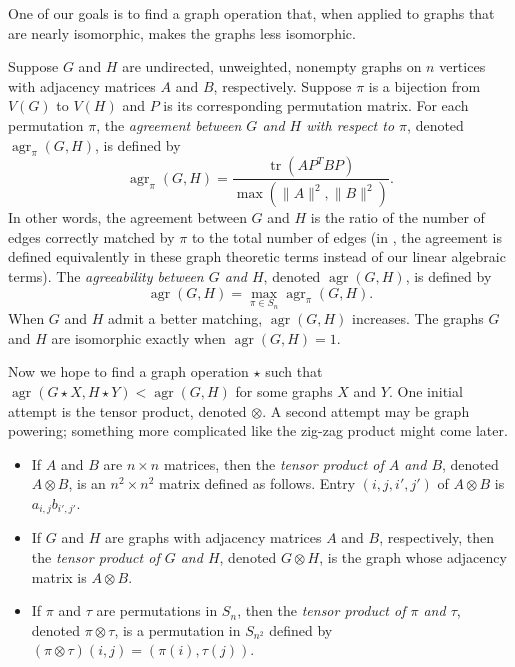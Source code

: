 \documentclass{article}
\newcommand{\1}{\mathbf{1}}
\DeclareMathOperator{\tr}{tr}
\DeclareMathOperator{\agr}{agr}
\begin{document}
One of our goals is to find a graph operation that, when applied to graphs that are nearly isomorphic, makes the graphs less isomorphic.

Suppose $G$ and $H$ are undirected, unweighted, nonempty graphs on $n$ vertices with adjacency matrices $A$ and $B$, respectively.
Suppose $\pi$ is a bijection from $V(G)$ to $V(H)$ and $P$ is its corresponding permutation matrix.
For each permutation $\pi$, the \emph{agreement between $G$ and $H$ with respect to $\pi$}, denoted $\agr_\pi(G, H)$, is defined by
\begin{equation*}
  \agr_\pi(G, H) = \frac{\tr(AP^TBP)}{\max(\|A\|^2, \|B\|^2)}.
\end{equation*}
In other words, the agreement between $G$ and $H$ is the ratio of the number of edges correctly matched by $\pi$ to the total number of edges (in \autocite{owwz14}, the agreement is defined equivalently in these graph theoretic terms instead of our linear algebraic terms).
The \emph{agreeability between $G$ and $H$}, denoted $\agr(G, H)$, is defined by
\begin{equation*}
  \agr(G, H) = \max_{\pi \in S_n} \agr_\pi(G, H).
\end{equation*}
When $G$ and $H$ admit a better matching, $\agr(G, H)$ increases.
The graphs $G$ and $H$ are isomorphic exactly when $\agr(G, H) = 1$.

Now we hope to find a graph operation $\star$ such that $\agr(G \star X, H \star Y) < \agr(G, H)$ for some graphs $X$ and $Y$.
One initial attempt is the tensor product, denoted $\otimes$.
A second attempt may be graph powering; something more complicated like the zig-zag product might come later.

\begin{definition}
  \mbox{}
  \begin{itemize}
  \item
    If $A$ and $B$ are $n \times n$ matrices, then the \emph{tensor product of $A$ and $B$}, denoted $A \otimes B$, is an $n^2 \times n^2$ matrix defined as follows.
    Entry $(i, j, i', j')$ of $A \otimes B$ is $a_{i, j} b_{i', j'}$.
  \item If $G$ and $H$ are graphs with adjacency matrices $A$ and $B$, respectively, then the \emph{tensor product of $G$ and $H$}, denoted $G \otimes H$, is the graph whose adjacency matrix is $A \otimes B$.
  \item If $\pi$ and $\tau$ are permutations in $S_n$, then the \emph{tensor product of $\pi$ and $\tau$}, denoted $\pi \otimes \tau$, is a permutation in $S_{n^2}$ defined by $(\pi \otimes \tau)(i, j) = (\pi(i), \tau(j))$.
  \end{itemize}
\end{definition}
\end{document}
